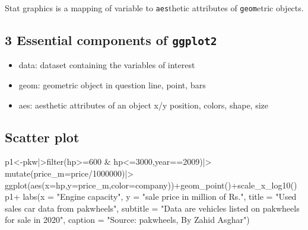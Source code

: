 \documentclass[
  letterpaper,
  DIV=11,
  numbers=noendperiod]{scrartcl}
\newenvironment{Shaded}{\begin{snugshade}}{\end{snugshade}}
\newcommand{\AttributeTok}[1]{\textcolor[rgb]{0.40,0.45,0.13}{#1}}
\newcommand{\DecValTok}[1]{\textcolor[rgb]{0.68,0.00,0.00}{#1}}
\newcommand{\FunctionTok}[1]{\textcolor[rgb]{0.28,0.35,0.67}{#1}}
\newcommand{\NormalTok}[1]{\textcolor[rgb]{0.00,0.23,0.31}{#1}}
\newcommand{\OtherTok}[1]{\textcolor[rgb]{0.00,0.23,0.31}{#1}}
\newcommand{\SpecialCharTok}[1]{\textcolor[rgb]{0.37,0.37,0.37}{#1}}
\newcommand{\StringTok}[1]{\textcolor[rgb]{0.13,0.47,0.30}{#1}}
\providecommand{\tightlist}{%
  \setlength{\itemsep}{0pt}\setlength{\parskip}{0pt}}\usepackage{longtable,booktabs,array}
\begin{document}
Stat graphics is a mapping of variable to \texttt{aes}thetic attributes
of \texttt{geom}etric objects.

\hypertarget{essential-components-of-ggplot2}{%
\subsection{\texorpdfstring{3 Essential components of
\texttt{ggplot2}}{3 Essential components of ggplot2}}\label{essential-components-of-ggplot2}}

\begin{itemize}
\tightlist
\item
  data: dataset containing the variables of interest
\item
  geom: geometric object in question line, point, bars
\item
  aes: aesthetic attributes of an object x/y position, colors, shape,
  size
\end{itemize}

\hypertarget{scatter-plot}{%
\subsection{Scatter plot}\label{scatter-plot}}

\begin{Shaded}
\begin{Highlighting}[]


\NormalTok{p1}\OtherTok{\textless{}{-}}\NormalTok{pkw}\SpecialCharTok{|\textgreater{}}\FunctionTok{filter}\NormalTok{(hp}\SpecialCharTok{\textgreater{}=}\DecValTok{600} \SpecialCharTok{\&}\NormalTok{ hp}\SpecialCharTok{\textless{}=}\DecValTok{3000}\NormalTok{,}\StringTok{\textasciigrave{}}\AttributeTok{year}\StringTok{\textasciigrave{}}\SpecialCharTok{==}\DecValTok{2009}\NormalTok{)}\SpecialCharTok{|\textgreater{}} \FunctionTok{mutate}\NormalTok{(}\AttributeTok{price\_m=}\NormalTok{price}\SpecialCharTok{/}\DecValTok{1000000}\NormalTok{)}\SpecialCharTok{|\textgreater{}}
  \FunctionTok{ggplot}\NormalTok{(}\FunctionTok{aes}\NormalTok{(}\AttributeTok{x=}\NormalTok{hp,}\AttributeTok{y=}\NormalTok{price\_m,}\AttributeTok{color=}\NormalTok{company))}\SpecialCharTok{+}\FunctionTok{geom\_point}\NormalTok{()}\SpecialCharTok{+}\FunctionTok{scale\_x\_log10}\NormalTok{()}
\NormalTok{p1}\SpecialCharTok{+}  \FunctionTok{labs}\NormalTok{(}\AttributeTok{x =} \StringTok{"Engine capacity"}\NormalTok{, }\AttributeTok{y =} \StringTok{"sale price in million of Rs."}\NormalTok{,}
       \AttributeTok{title =} \StringTok{"Used sales car data from pakwheels"}\NormalTok{,}
       \AttributeTok{subtitle =} \StringTok{"Data are vehicles listed on pakwheels for sale in 2020"}\NormalTok{,}
       \AttributeTok{caption =} \StringTok{"Source: pakwheels, By Zahid Asghar"}\NormalTok{)}
\end{Highlighting}
\end{Shaded}
\end{document}
